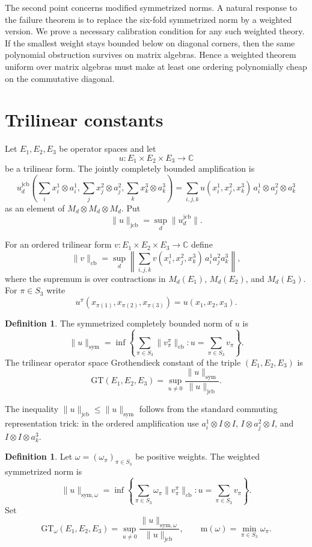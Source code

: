 \documentclass[11pt]{amsart}
\theoremstyle{definition}
\newtheorem{definition}[theorem]{Definition}
\newcommand{\C}{\mathbb C}
\newcommand{\ot}{\otimes}
\newcommand{\cb}{\mathrm{cb}}
\newcommand{\jcb}{\mathrm{jcb}}
\newcommand{\sym}{\mathrm{sym}}
\newcommand{\minw}{\mathrm{m}}
\newcommand{\GT}{\mathrm{GT}}
\begin{document}
The second point concerns modified symmetrized norms. A natural response to
the failure theorem is to replace the six-fold symmetrized norm by a weighted
version. We prove a necessary calibration condition for any such weighted
theory. If the smallest weight stays bounded below on diagonal corners, then
the same polynomial obstruction survives on matrix algebras. Hence a weighted
theorem uniform over matrix algebras must make at least one ordering
polynomially cheap on the commutative diagonal.

\section{Trilinear constants}

Let $E_1,E_2,E_3$ be operator spaces and let
\[
   u:E_1\times E_2\times E_3\longrightarrow \C
\]
be a trilinear form. The jointly completely bounded amplification is
\[
   u_d^{\jcb}\left(\sum_i x_i^1\ot a_i^1,
                  \sum_j x_j^2\ot a_j^2,
                  \sum_k x_k^3\ot a_k^3\right)
   =
   \sum_{i,j,k}u(x_i^1,x_j^2,x_k^3)\,
      a_i^1\ot a_j^2\ot a_k^3
\]
as an element of $M_d\ot M_d\ot M_d$. Put
\[
   \|u\|_{\jcb}
   =
   \sup_d \|u_d^{\jcb}\|.
\]

For an ordered trilinear form $v:E_1\times E_2\times E_3\to\C$ define
\[
   \|v\|_{\cb}
   =
   \sup_d
   \left\|
      \sum_{i,j,k}v(x_i^1,x_j^2,x_k^3)\,
      a_i^1 a_j^2 a_k^3
   \right\|,
\]
where the supremum is over contractions in $M_d(E_1)$, $M_d(E_2)$, and
$M_d(E_3)$. For $\pi\in S_3$ write
\[
   u^\pi(x_{\pi(1)},x_{\pi(2)},x_{\pi(3)})
   =
   u(x_1,x_2,x_3).
\]

\begin{definition}
The symmetrized completely bounded norm of $u$ is
\[
   \|u\|_{\sym}
   =
   \inf
   \left\{
      \sum_{\pi\in S_3}\|v_\pi^\pi\|_{\cb}:
      u=\sum_{\pi\in S_3}v_\pi
   \right\}.
\]
The trilinear operator space Grothendieck constant of the triple
$(E_1,E_2,E_3)$ is
\[
   \GT(E_1,E_2,E_3)
   =
   \sup_{u\ne0}\frac{\|u\|_{\sym}}{\|u\|_{\jcb}}.
\]
\end{definition}

The inequality $\|u\|_{\jcb}\le \|u\|_{\sym}$ follows from the standard
commuting representation trick: in the ordered amplification use
$a_i^1\ot I\ot I$, $I\ot a_j^2\ot I$, and $I\ot I\ot a_k^3$.

\begin{definition}
Let $\omega=(\omega_\pi)_{\pi\in S_3}$ be positive weights. The weighted
symmetrized norm is
\[
   \|u\|_{\sym,\omega}
   =
   \inf
   \left\{
      \sum_{\pi\in S_3}\omega_\pi\|v_\pi^\pi\|_{\cb}:
      u=\sum_{\pi\in S_3}v_\pi
   \right\}.
\]
Set
\[
   \GT_\omega(E_1,E_2,E_3)
   =
   \sup_{u\ne0}\frac{\|u\|_{\sym,\omega}}{\|u\|_{\jcb}},
   \qquad
   \minw(\omega)=\min_{\pi\in S_3}\omega_\pi .
\]
\end{definition}
\end{document}
